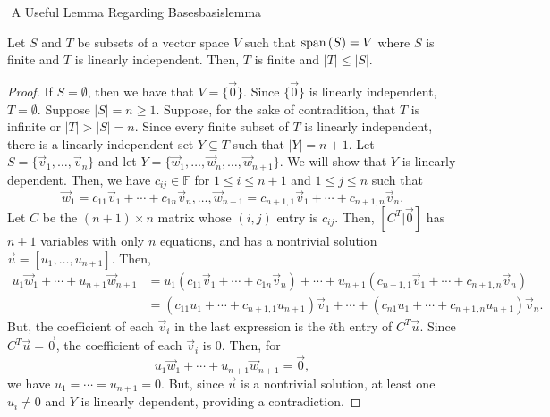         \begin{theorem}{\Stop\,\,A Useful Lemma Regarding Bases}{basislemma}

            Let \(S\) and \(T\) be subsets of a vector space \(V\) such that \(\text{span\,}(S)=V\) where \(S\) is finite and \(T\) is linearly independent. Then, \(T\) is finite and \(|T|\leq|S|\).
            \begin{proof}
                If \(S=\emptyset\), then we have that \(V=\{\vec{0}\}\). Since \(\{\vec{0}\}\) is linearly independent, \(T=\emptyset\). Suppose \(|S|=n\geq1\). Suppose, for the sake of contradition, that \(T\) is infinite or \(|T|>|S|=n\). Since every finite subset of \(T\) is linearly independent, there is a linearly independent set \(Y\subseteq T\) such that \(|Y|=n+1\). Let \(S=\{\vec{v}_1,\ldots,\vec{v}_n\}\) and let \(Y=\{\vec{w}_1,\ldots,\vec{w}_n,\ldots,\vec{w}_{n+1}\}\). We will show that \(Y\) is linearly dependent. Then, we have \(c_{ij}\in\mathbb{F}\) for \(1\leq i \leq n+1\) and \(1\leq j\leq n\) such that
                \begin{equation*}
                    \vec{w}_1=c_{11}\vec{v}_1+\cdots+c_{1n}\vec{v}_n,\ldots,\vec{w}_{n+1}=c_{n+1,1}\vec{v}_1+\cdots+c_{n+1,n}\vec{v}_n.
                \end{equation*}
                Let \(C\) be the \((n+1)\times n\) matrix whose \((i,j)\) entry is \(c_{ij}\). Then, \([C^T|\vec{0}]\) has \(n+1\) variables with only \(n\) equations, and has a nontrivial solution \(\vec{u}=[u_1,\ldots,u_{n+1}]\). Then,
                \begin{align*}
                    u_1\vec{w}_1+\cdots+u_{n+1}\vec{w}_{n+1}&=u_1(c_{11}\vec{v}_1+\cdots+c_{1n}\vec{v}_n)+\cdots+u_{n+1}(c_{n+1,1}\vec{v}_1+\cdots+c_{n+1,n}\vec{v}_n) \\
                    &=(c_{11}u_1+\cdots+c_{n+1,1}u_{n+1})\vec{v}_1+\cdots+(c_{n1}u_1+\cdots+c_{n+1,n}u_{n+1})\vec{v}_n.
                \end{align*}
                But, the coefficient of each \(\vec{v}_i\) in the last expression is the \(i\)th entry of \(C^T\vec{u}\). Since \(C^T\vec{u}=\vec{0}\), the coefficient of each \(\vec{v}_i\) is \(0\). Then, for
                \begin{equation*}
                    u_1\vec{w}_1+\cdots+u_{n+1}\vec{w}_{n+1}=\vec{0},
                \end{equation*} 
                we have \(u_1=\cdots=u_{n+1}=0\).
                But, since \(\vec{u}\) is a nontrivial solution, at least one \(u_i\neq0\) and \(Y\) is linearly dependent, providing a contradiction.
            \end{proof}
        \end{theorem}

